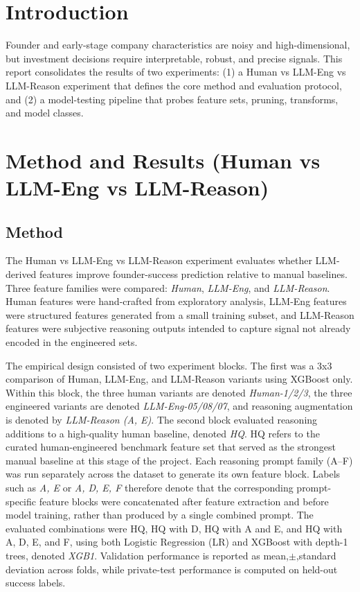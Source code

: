 \documentclass{article}
\theoremstyle{plain}
\theoremstyle{definition}
\theoremstyle{remark}
\begin{document}
\section{Introduction}
Founder and early-stage company characteristics are noisy and high-dimensional, but investment decisions require interpretable, robust, and precise signals. This report consolidates the results of two experiments: (1) a Human vs LLM-Eng vs LLM-Reason experiment that defines the core method and evaluation protocol, and (2) a model-testing pipeline that probes feature sets, pruning, transforms, and model classes.

\section{Method and Results (Human vs LLM-Eng vs LLM-Reason)}
\subsection{Method}
The Human vs LLM-Eng vs LLM-Reason experiment evaluates whether LLM-derived features improve founder-success prediction relative to manual baselines. Three feature families were compared: \textit{Human}, \textit{LLM-Eng}, and \textit{LLM-Reason}. Human features were hand-crafted from exploratory analysis, LLM-Eng features were structured features generated from a small training subset, and LLM-Reason features were subjective reasoning outputs intended to capture signal not already encoded in the engineered sets.

The empirical design consisted of two experiment blocks. The first was a 3x3 comparison of Human, LLM-Eng, and LLM-Reason variants using XGBoost only. Within this block, the three human variants are denoted \textit{Human-1/2/3}, the three engineered variants are denoted \textit{LLM-Eng-05/08/07}, and reasoning augmentation is denoted by \textit{LLM-Reason (A, E)}. The second block evaluated reasoning additions to a high-quality human baseline, denoted \textit{HQ}. HQ refers to the curated human-engineered benchmark feature set that served as the strongest manual baseline at this stage of the project. Each reasoning prompt family (A--F) was run separately across the dataset to generate its own feature block. Labels such as \textit{A, E} or \textit{A, D, E, F} therefore denote that the corresponding prompt-specific feature blocks were concatenated after feature extraction and before model training, rather than produced by a single combined prompt. The evaluated combinations were HQ, HQ with D, HQ with A and E, and HQ with A, D, E, and F, using both Logistic Regression (LR) and XGBoost with depth-1 trees, denoted \textit{XGB1}. Validation performance is reported as mean,$\pm$,standard deviation across folds, while private-test performance is computed on held-out success labels.
\end{document}
